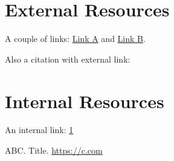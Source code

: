 \documentclass{article}
\begin{document}
\section{External Resources}
\label{sec:external}
A couple of links: \href{https://a.com}{Link A} and \href{https://b.com}{Link B}.

Also a citation with external link: \cite{sample}

\section{Internal Resources}
An internal link: \ref{sec:external}


\begin{thebibliography}{9}
 ABC. Title. \href{https://c.com}{https://c.com}
\end{thebibliography}
\end{document}
